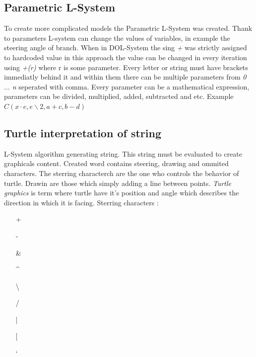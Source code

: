\documentclass[b5paper,twoside,11pt]{article}
\begin{document}
\subsection*{Parametric L-System}
To create more complicated models the Parametric L-System was created. Thank to parameters L-system can change the values of variables, in example the steering angle of branch. When in DOL-System the sing \textit{+} was strictly assigned to hardcoded value in this approach the value can be changed in every iteration using \textit{+(r)} where r is some parameter. Every letter or string must have brackets immediatly behind it and within them there can be multiple parameters from \textit{0 $\ldots$ n} seperated with comma. Every parameter can be a mathematical expression, parameters can be divided, multiplied, added, subtracted and etc. Example $C(x\cdot e,e\backslash 2,a+c,b-d)$
\subsection*{Turtle interpretation of string}
L-System algorithm generating string. This string must be evaluated to create graphicals content. Created word contains steering, drawing and ommited characters. The sterring characterch are the one who controls the behavior of turtle. Drawin are those which simply adding a line between points.
\textit{Turtle graphics} is term where turtle have it's position and angle which describes the direction in which it is facing. 
Sterring characters :
\begin{itemize}
\item[+] %
\item[-] %
\item[\&] %
\item[\string^] %
\item[\textbackslash] %
\item[/] %
\item[|] %
\item[[] %
\item [\char`\]]  %
\end{itemize}	
\end{document}
